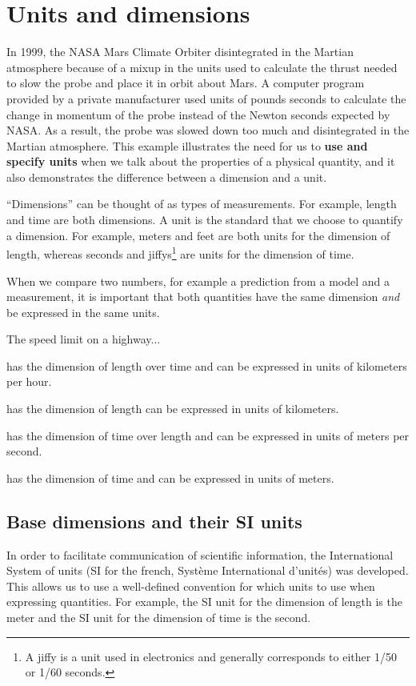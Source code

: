 \section{Units and dimensions}
In 1999, the NASA Mars Climate Orbiter disintegrated in the Martian atmosphere because of a mixup in the units used to calculate the thrust needed to slow the probe and place it in orbit about Mars. A computer program provided by a private manufacturer used units of pounds seconds to calculate the change in momentum of the probe instead of the Newton seconds expected by NASA. As a result, the probe was slowed down too much and disintegrated in the Martian atmosphere. This example illustrates the need for us to \textbf{use and specify units} when we talk about the properties of a physical quantity, and it also demonstrates the difference between a dimension and a unit.

``Dimensions'' can be thought of as types of measurements. For example, length and time are both dimensions. A unit is the standard that we choose to quantify a dimension. For example, meters and feet are both units for the dimension of length, whereas seconds and jiffys\footnote{A jiffy is a unit used in electronics and generally corresponds to either 1/50 or 1/60 seconds.} are units for the dimension of time.

When we compare two numbers, for example a prediction from a model and a measurement, it is important that both quantities have the same dimension \textit{and} be expressed in the same units.
\begin{checkpoint}
\begin{MCquestion}{The speed limit on a highway...}
\item has the dimension of length over time and can be expressed in units of kilometers per hour. \correct
\item has the dimension of length can be expressed in units of kilometers.
\item has the dimension of time over length and can be expressed in units of meters per second.
\item has the dimension of time and can be expressed in units of meters.
\end{MCquestion}
\end{checkpoint}

\subsection{Base dimensions and their SI units}
In order to facilitate communication of scientific information, the International System of units (SI for the french, Syst\`eme International d'unit\'es) was developed. This allows us to use a well-defined convention for which units to use when expressing quantities. For example, the SI unit for the dimension of length is the meter and the SI unit for the dimension of time is the second.

